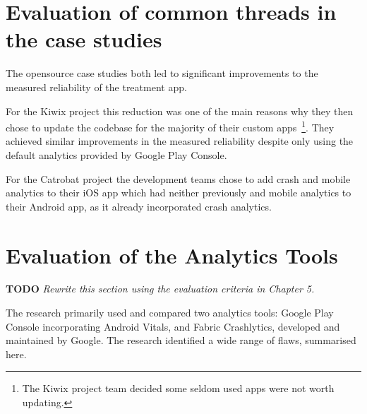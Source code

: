 \newpage
\section{Evaluation of common threads in the case studies}
The opensource case studies both led to significant improvements to the measured reliability of the treatment app. 

For the Kiwix project this reduction was one of the main reasons why they then chose to update the codebase for the majority of their custom apps~\footnote{The Kiwix project team decided some seldom used apps were not worth updating.}. They achieved similar improvements in the measured reliability despite only using the default analytics provided by Google Play Console. 

For the Catrobat project the development teams chose to add crash and mobile analytics to their iOS app which had neither previously and mobile analytics to their Android app, as it already incorporated crash analytics.



\section{Evaluation of the Analytics Tools}

\textbf{TODO} \textit{Rewrite this section using the evaluation criteria in Chapter 5.}

The research primarily used and compared two analytics tools: Google Play Console incorporating Android Vitals, and Fabric Crashlytics, developed and maintained by Google. The research identified a wide range of flaws, summarised here.

